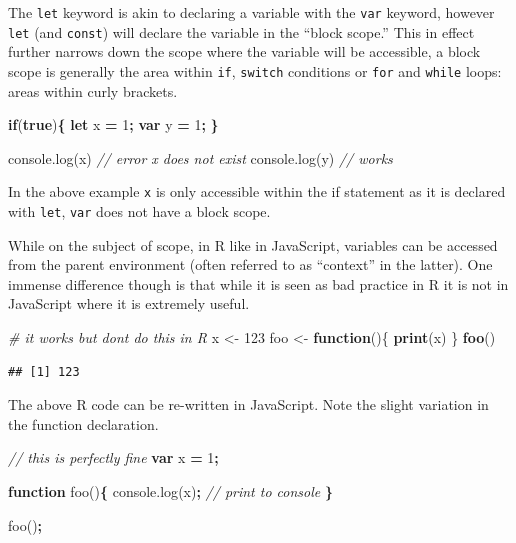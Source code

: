 \documentclass[
]{krantz}
\makeatletter
\newenvironment{Shaded}{\begin{snugshade}}{\end{snugshade}}
\newcommand{\AttributeTok}[1]{\textcolor[rgb]{0.61,0.61,0.61}{#1}}
\newcommand{\CommentTok}[1]{\textcolor[rgb]{0.37,0.37,0.37}{\textit{#1}}}
\newcommand{\ControlFlowTok}[1]{\textcolor[rgb]{0.27,0.27,0.27}{\textbf{#1}}}
\newcommand{\DecValTok}[1]{\textcolor[rgb]{0.06,0.06,0.06}{#1}}
\newcommand{\KeywordTok}[1]{\textcolor[rgb]{0.27,0.27,0.27}{\textbf{#1}}}
\newcommand{\NormalTok}[1]{#1}
\newcommand{\OperatorTok}[1]{\textcolor[rgb]{0.43,0.43,0.43}{\textbf{#1}}}
\newcommand{\StringTok}[1]{\textcolor[rgb]{0.5,0.5,0.5}{#1}}
\newcommand{\VariableTok}[1]{\textcolor[rgb]{0,0,0}{#1}}
\newenvironment{kframe}{%
\medskip{}
\setlength{\fboxsep}{.8em}
 \def\at@end@of@kframe{}%
 \ifinner\ifhmode%
  \def\at@end@of@kframe{\end{minipage}}%
  \begin{minipage}{\columnwidth}%
 \fi\fi%
 \def\FrameCommand##1{\hskip\@totalleftmargin \hskip-\fboxsep
 \colorbox{shadecolor}{##1}\hskip-\fboxsep
     \hskip-\linewidth \hskip-\@totalleftmargin \hskip\columnwidth}%
 \MakeFramed {\advance\hsize-\width
   \@totalleftmargin\z@ \linewidth\hsize
   \@setminipage}}%
 {\par\unskip\endMakeFramed%
 \at@end@of@kframe}
\renewenvironment{Shaded}{\begin{kframe}}{\end{kframe}}
\makeatother
\begin{document}
The \texttt{let} keyword is akin to declaring a variable with the \texttt{var} keyword, however \texttt{let} (and \texttt{const}) will declare the variable in the ``block scope.'' This in effect further narrows down the scope where the variable will be accessible, a block scope is generally the area within \texttt{if}, \texttt{switch} conditions or \texttt{for} and \texttt{while} loops: areas within curly brackets.

\begin{Shaded}
\begin{Highlighting}[]
\ControlFlowTok{if}\NormalTok{(}\KeywordTok{true}\NormalTok{)}\OperatorTok{\{}
  \KeywordTok{let}\NormalTok{ x }\OperatorTok{=} \DecValTok{1}\OperatorTok{;}
  \KeywordTok{var}\NormalTok{ y }\OperatorTok{=} \DecValTok{1}\OperatorTok{;}
\OperatorTok{\}}

\VariableTok{console}\NormalTok{.}\AttributeTok{log}\NormalTok{(x) }\CommentTok{// error x does not exist}
\VariableTok{console}\NormalTok{.}\AttributeTok{log}\NormalTok{(y) }\CommentTok{// works}
\end{Highlighting}
\end{Shaded}

In the above example \texttt{x} is only accessible within the if statement as it is declared with \texttt{let}, \texttt{var} does not have a block scope.

While on the subject of scope, in R like in JavaScript, variables can be accessed from the parent environment (often referred to as ``context'' in the latter). One immense difference though is that while it is seen as bad practice in R it is not in JavaScript where it is extremely useful.

\begin{Shaded}
\begin{Highlighting}[]
\CommentTok{\# it works but don\textquotesingle{}t do this in R}
\NormalTok{x <{-}}\StringTok{ }\DecValTok{123}
\NormalTok{foo <{-}}\StringTok{ }\ControlFlowTok{function}\NormalTok{()\{}
  \KeywordTok{print}\NormalTok{(x)}
\NormalTok{\}}
\KeywordTok{foo}\NormalTok{()}
\end{Highlighting}
\end{Shaded}

\begin{verbatim}
## [1] 123
\end{verbatim}

The above R code can be re-written in JavaScript. Note the slight variation in the function declaration.

\begin{Shaded}
\begin{Highlighting}[]
\CommentTok{// this is perfectly fine}
\KeywordTok{var}\NormalTok{ x }\OperatorTok{=} \DecValTok{1}\OperatorTok{;}

\KeywordTok{function} \AttributeTok{foo}\NormalTok{()}\OperatorTok{\{}
  \VariableTok{console}\NormalTok{.}\AttributeTok{log}\NormalTok{(x)}\OperatorTok{;} \CommentTok{// print to console}
\OperatorTok{\}}

\AttributeTok{foo}\NormalTok{()}\OperatorTok{;}
\end{Highlighting}
\end{Shaded}
\end{document}
